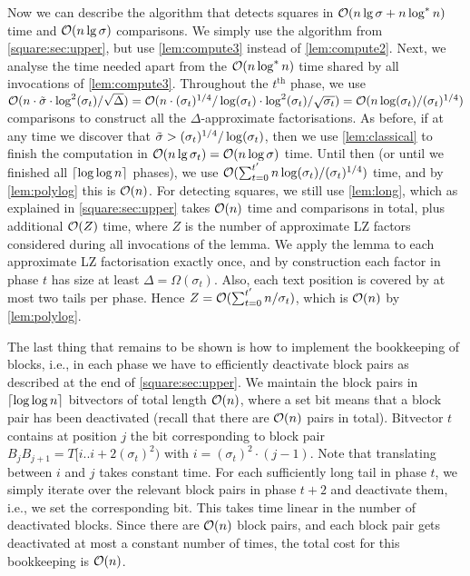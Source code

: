 Now we can describe the algorithm that detects squares in $\mathcal{O}(n \lg \sigma + n \log^* n)$ time and $\mathcal{O}(n \lg \sigma)$ comparisons. 
We simply use the algorithm from \cref{square:sec:upper}, but use \cref{lem:compute3} instead of \cref{lem:compute2}. Next, we analyse the time needed apart from the $\mathcal{O}(n \log^* n)$ time shared by all invocations of \cref{lem:compute3}. Throughout the $t^{\text{th}}$ phase, we use $\mathcal{O}(n \cdot \tilde{\sigma} \cdot \log^2(\sigma_t) / \sqrt{\Delta}) = \mathcal{O}(n\cdot (\sigma_{t})^{1/4}/\log(\sigma_{t})\cdot \log^2(\sigma_{t})/\sqrt{\sigma_{t}})=\mathcal{O}(n \log (\sigma_t)/(\sigma_{t})^{1/4})$ comparisons
to construct all the $\Delta$-approximate factorisations. As before, if at any time we discover that $\tilde{\sigma} > (\sigma_t)^{1/4} / \log(\sigma_t)$, then we use \cref{lem:classical} to finish the computation in $\mathcal{O}(n \lg \sigma_t) = \mathcal{O}(n \log \sigma)$ time. Until then (or until we finished all $\left\lceil\log \log n\right\rceil$ phases), we use $\mathcal{O}(\sum_{t=0}^{t'} n \log(\sigma_t)/(\sigma_{t})^{1/4})$ time, and by \cref{lem:polylog} this is $\mathcal{O}(n)$. 
For detecting squares, we still use \cref{lem:long}, which as explained in \cref{square:sec:upper} takes $\mathcal{O}(n)$ time and comparisons in total, plus additional $\mathcal{O}(Z)$ time, where $Z$ is the number of approximate LZ factors considered during all invocations of the lemma. 
We apply the lemma to each approximate LZ factorisation exactly once, and by construction each factor in phase $t$ has size at least $\Delta = \Omega(\sigma_t)$. Also, each text position is covered by at most two tails per phase. Hence $Z = \mathcal{O}(\sum_{t=0}^{t'} n/\sigma_t)$, which is $\mathcal{O}(n)$ by \cref{lem:polylog}.

The last thing that remains to be shown is how to implement the bookkeeping of blocks, i.e., in each phase we have to efficiently deactivate block pairs as described at the end of \cref{square:sec:upper}. 
We maintain the block pairs in $\left\lceil\log \log n\right\rceil$ bitvectors of total length $\mathcal{O}(n)$, where a set bit means that a block pair has been deactivated (recall that there are $\mathcal{O}(n)$ pairs in total). 
Bitvector $t$ contains at position $j$ the bit corresponding to block pair $B_{j}B_{j + 1} = T[i..i+2(\sigma_t)^2)$ with $i = (\sigma_t)^2 \cdot (j - 1)$. Note that translating between $i$ and $j$ takes constant time.
For each sufficiently long tail in phase $t$, we simply iterate over the relevant block pairs in phase $t + 2$ and deactivate them, i.e., we set the corresponding bit. This takes time linear in the number of deactivated blocks.
Since there are $\mathcal{O}(n)$ block pairs, and each block pair gets deactivated at most a constant number of times, the total cost for this bookkeeping is $\mathcal{O}(n)$.

